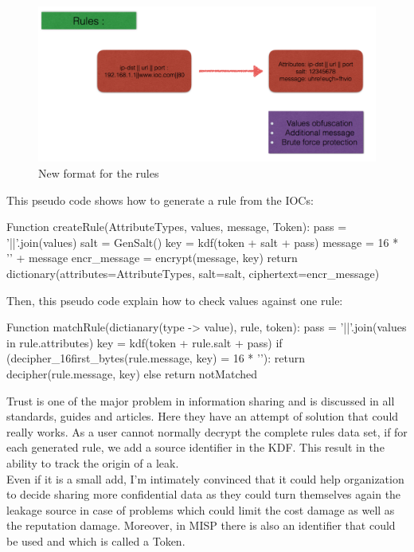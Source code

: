 \documentclass{eplmastersthesis}
\begin{document}
\begin{figure}[h!]
\begin{center}
	\includegraphics[scale=0.3]{res/obfuscation-rule}
	\caption{New format for the rules}
	\label{Obfuscation-Rule}
\end{center}
\end{figure}


This pseudo code shows how to generate a rule from the IOCs:

\begin{center}
\begin{boxedverbatim}
Function createRule(AttributeTypes, values, message, Token):
        pass = '||'.join(values)
        salt = GenSalt()
        key = kdf(token + salt + pass)
        message = 16 * '' + message
        encr_message = encrypt(message, key)
        return dictionary(attributes=AttributeTypes, 
                            salt=salt,
                            ciphertext=encr_message)
\end{boxedverbatim}
\end{center}

Then, this pseudo code explain how to check values against one rule:
\begin{center}
\begin{boxedverbatim}
Function matchRule(dictianary(type -> value), rule, token):
        pass = '||'.join(values in rule.attributes)
        key = kdf(token + rule.salt + pass)
        if (decipher_16first_bytes(rule.message, key) = 16 * ''):
                return decipher(rule.message, key)
        else
                return notMatched
\end{boxedverbatim}
\end{center}


Trust is one of the major problem in information sharing and is discussed in all standards, guides and articles. Here they have an attempt of solution that could really works. As a user cannot normally decrypt the complete rules data set, if for each generated rule, we add a source identifier in the KDF. This result in the ability to track the origin of a leak. \\
Even if it is a small add, I'm intimately convinced that it could help organization to decide sharing more confidential data as they could turn themselves 
again the leakage source in case of problems which could limit the cost damage as well as the reputation damage. Moreover, in MISP there is also an identifier that could be used and which is called a Token.\\
\end{document}
